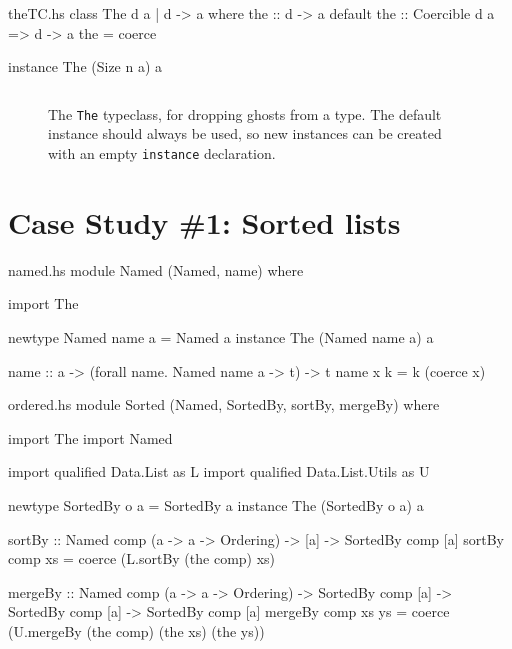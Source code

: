 \documentclass[format=sigplan, review=false, screen=true]{acmart}
\begin{document}
\begin{filecontents*}{theTC.hs}
class The d a | d -> a where
    the :: d -> a
    default the :: Coercible d a => d -> a
    the = coerce
    
instance The (Size n a) a
\end{filecontents*}

\begin{figure}
  \inputminted{haskell}{theTC.hs}
  \caption{The \texttt{The} typeclass, for dropping ghosts
    from a type. The default instance should always be used,
    so new instances can be created with an empty
    \texttt{instance} declaration.}
\end{figure}

\section{Case Study \#1: Sorted lists}

\begin{filecontents*}{named.hs}
module Named (Named, name) where

import The

newtype Named name a = Named a
instance The (Named name a) a

name :: a -> (forall name. Named name a -> t) -> t
name x k = k (coerce x)
\end{filecontents*}

\begin{filecontents*}{ordered.hs}
module Sorted
  (Named, SortedBy, sortBy, mergeBy) where   

import The
import Named

import qualified Data.List as L
import qualified Data.List.Utils as U

newtype SortedBy o a = SortedBy a
instance The (SortedBy o a) a
  
sortBy :: Named comp (a -> a -> Ordering)
       -> [a]
       -> SortedBy comp [a]
sortBy comp xs = coerce (L.sortBy (the comp) xs)

mergeBy :: Named comp (a -> a -> Ordering)
        -> SortedBy comp [a]
        -> SortedBy comp [a]
        -> SortedBy comp [a]
mergeBy comp xs ys =
  coerce (U.mergeBy (the comp) (the xs) (the ys))        
\end{filecontents*}

\end{document}
